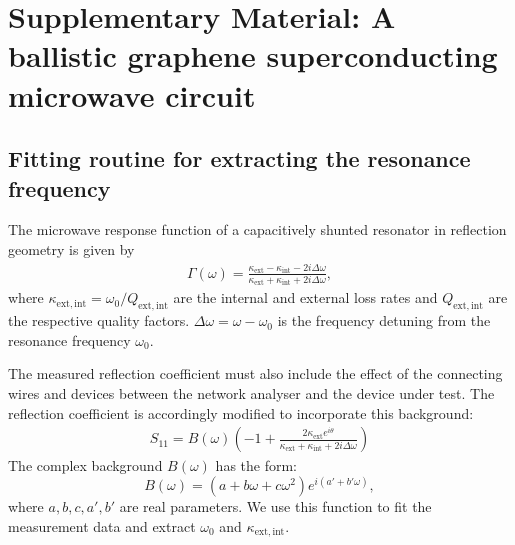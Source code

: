 \clearpage
\section{Supplementary Material: A ballistic graphene superconducting microwave circuit}



\subsection{Fitting routine for extracting the resonance frequency}\label{sec:fitting}
\noindent The microwave response function of a capacitively shunted resonator in reflection geometry is given by \cite{pozarMicrowaveEngineering2012}
\begin{eqnarray}
\Gamma(\omega) = \frac{\kappa_\mathrm{ext}-\kappa_\mathrm{int}-2i\Delta\omega}{\kappa_\mathrm{ext}+\kappa_\mathrm{int}+2i\Delta\omega},
\end{eqnarray}
where $\kappa_\mathrm{ext,int}=\omega_0/Q_\mathrm{ext,int}$ are the internal and external loss rates and $Q_\mathrm{ext,int}$ are the respective quality factors.
$\Delta\omega=\omega-\omega_0$ is the frequency detuning from the resonance frequency $\omega_0$.

The measured reflection coefficient must also include the effect of the connecting wires and devices between the network analyser and the device under test.
The reflection coefficient is accordingly modified to incorporate this background:
\begin{eqnarray}
S_{11} = B(\omega)\left(-1 + \frac{2\kappa_\mathrm{ext}e^{i\theta}}{\kappa_\mathrm{ext}+\kappa_\mathrm{int}+2i\Delta\omega}\right)
\end{eqnarray}
The complex background $B(\omega)$ has the form:
\begin{equation}
B(\omega) = (a+b\omega+c\omega^2)e^{i(a'+b'\omega)},
\end{equation}
where $a,b,c,a',b'$ are real parameters.  We use this function to fit the measurement data and extract $\omega_0$ and $\kappa_\mathrm{ext,int}$.

